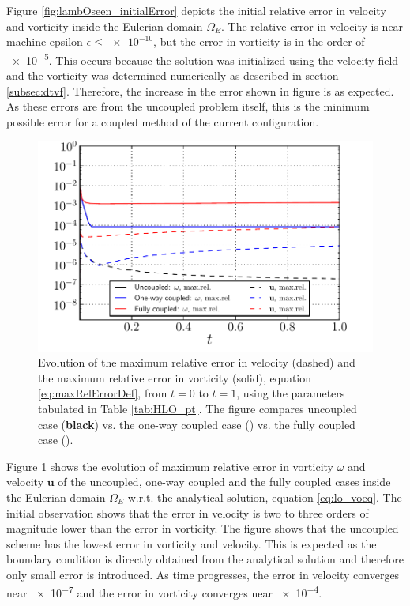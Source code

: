 Figure \ref{fig:lambOseen_initialError} depicts the initial relative error in velocity and vorticity inside the Eulerian domain $\Omega_E$. The relative error in velocity is near machine epsilon $\epsilon \le \num{e-10}$, but the error in vorticity is in the order of \num{e-5}. This occurs because the solution was initialized using the velocity field and the vorticity was determined numerically as described in section \ref{subsec:dtvf}. Therefore, the increase in the error shown in figure is as expected. As these errors are from the uncoupled problem itself, this is the minimum possible error for a coupled method of the current configuration.

	\begin{figure}[!t]
	\centering
	\includegraphics[width=0.6\linewidth]{./figures/validation/lambOseent2/lambOseen_comparision_corrected.pdf}
	\caption{Evolution of the maximum relative error in velocity (dashed) and the maximum relative error in vorticity (solid), equation \ref{eq:maxRelErrorDef}, from $t=0$ to $t=1$, using the parameters tabulated in Table \ref{tab:HLO_pt}. The figure compares uncoupled case (\textbf{black}) vs. the one-way coupled case ({}) vs. the fully coupled case ({}).}
	\label{fig:lambOseen_comparison}
	\end{figure}

Figure \ref{fig:lambOseen_comparison} shows the evolution of maximum relative error in vorticity $\omega$ and velocity $\mathbf{u}$ of the uncoupled, one-way coupled and the fully coupled cases inside the Eulerian domain $\Omega_E$ w.r.t. the analytical solution, equation \ref{eq:lo_voeq}. The initial observation shows that the error in velocity is two to three orders of magnitude lower than the error in vorticity. The figure shows that the uncoupled scheme has the lowest error in vorticity and velocity. This is expected as the boundary condition is directly obtained from the analytical solution and therefore only small error is introduced. As time progresses, the error in velocity converges near \num{e-7} and the error in vorticity converges near \num{e-4}.

